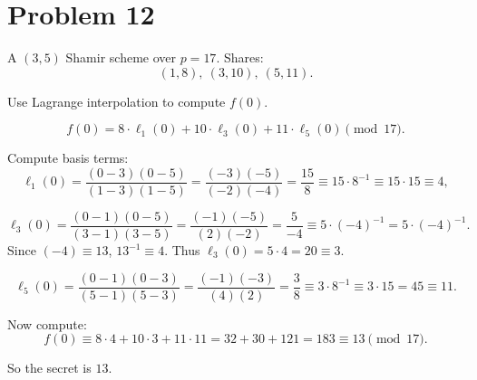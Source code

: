 \section*{Problem 12}

A \((3,5)\) Shamir scheme over \(p=17\). Shares:
\[
(1,8),\ (3,10),\ (5,11).
\]

Use Lagrange interpolation to compute \(f(0)\).

\[
f(0)
= 8\cdot \ell_1(0)+10\cdot \ell_3(0)+11\cdot \ell_5(0) \pmod{17}.
\]

Compute basis terms:
\[
\ell_1(0)=\frac{(0-3)(0-5)}{(1-3)(1-5)}
= \frac{(-3)(-5)}{(-2)(-4)}
= \frac{15}{8}\equiv 15\cdot 8^{-1}\equiv 15\cdot 15\equiv 4,
\]

\[
\ell_3(0)=\frac{(0-1)(0-5)}{(3-1)(3-5)}
=\frac{(-1)(-5)}{(2)(-2)}
=\frac{5}{-4}\equiv 5\cdot (-4)^{-1}
=5\cdot (-4)^{-1}.
\]
Since \((-4)\equiv 13\), \(13^{-1}\equiv 4\).  
Thus \(\ell_3(0)=5\cdot 4=20\equiv 3\).

\[
\ell_5(0)=\frac{(0-1)(0-3)}{(5-1)(5-3)}
= \frac{(-1)(-3)}{(4)(2)}
= \frac{3}{8}\equiv 3\cdot 8^{-1}\equiv 3\cdot 15=45\equiv 11.
\]

Now compute:
\[
f(0)\equiv 8\cdot 4 + 10\cdot 3 + 11\cdot 11
=32+30+121=183\equiv \boxed{13}\pmod{17}.
\]

So the secret is \(\boxed{13}\).
